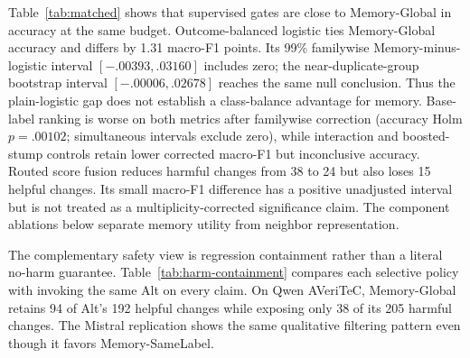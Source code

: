 \documentclass[runningheads]{llncs}
\begin{document}
Table~\ref{tab:matched} shows that supervised gates are close to
Memory-Global in accuracy at the same budget. Outcome-balanced logistic ties
Memory-Global accuracy and differs by 1.31 macro-F1 points. Its 99\%
familywise Memory-minus-logistic interval $[-.00393,.03160]$ includes zero;
the near-duplicate-group bootstrap interval $[-.00006,.02678]$ reaches the
same null conclusion.
Thus the plain-logistic gap
does not establish a class-balance advantage for memory. Base-label ranking
is worse on both metrics after familywise correction (accuracy Holm
$p=.00102$; simultaneous intervals exclude zero), while interaction and
boosted-stump controls retain lower corrected macro-F1 but inconclusive
accuracy. Routed score fusion reduces harmful changes
from 38 to 24 but also loses 15 helpful changes. Its small macro-F1 difference
has a positive unadjusted interval but is not treated as a multiplicity-corrected
significance claim. The component ablations below separate memory utility
from neighbor representation.

The complementary safety view is regression containment rather than a
literal no-harm guarantee. Table~\ref{tab:harm-containment} compares each
selective policy with invoking the same Alt on every claim. On Qwen
AVeriTeC, Memory-Global retains 94 of Alt's 192 helpful changes while exposing
only 38 of its 205 harmful changes. The Mistral replication shows the same
qualitative filtering pattern even though it favors Memory-SameLabel.
\end{document}

